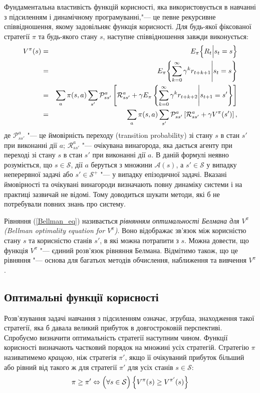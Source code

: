 Фундаментальна властивість функцій корисності, яка використовується в навчанні з підсиленням і динамічному програмуванні,"--- це певне рекурсивне співвідношення, якому задовільняє функція корисності. Для будь-якої фіксованої стратегії $\pi$ та будь-якого стану $s$, наступне співвідношення завжди виконується:
\begin{eqnarray}
V^\pi(s) & = & E_\pi \Bigl\{R_t \Big| s_t = s \Bigr\} \nonumber\\
			& = & E_\pi \Biggl\{\sum_{k=0}^{\infty}\gamma^k r_{t+k+1} \Bigg| s_t = s \Biggr\} \nonumber\\
			& = & \sum_a \pi(s,a)\sum_{s'}\mathcal{P}^a_{ss'} \left[ \mathcal{R}^a_{ss'}+\gamma E_\pi \left\{\sum_{k=0}^{\infty}\gamma^k r_{t+k+2} \Bigg| s_{t+1} = s' \right\} \right] \nonumber\\
			& = & \sum_a \pi(s,a)\sum_{s'}\mathcal{P}^a_{ss'} \left[ \mathcal{R}^a_{ss'}+\gamma V^\pi(s') \right],
\label{Bellman_eq}
\end{eqnarray}
де $\mathcal{P}^a_{ss'}$ "--- це ймовірність переходу (transition probability) зі стану $s$ в стан $s'$ при виконанні дії $a$; $\mathcal{R}^a_{ss'}$ "--- очікувана винагорода, яка дається агенту при переході зі стану $s$ в стан $s'$ при виконанні дії $a$. В даній формулі неявно розуміється, що $s \in \mathcal{S}$, дії $a$ беруться з множини $\mathcal{A}(s)$, а $s' \in \mathcal{S}$ у випадку неперервної задачі або $s' \in \mathcal{S^+}$ "--- у випадку епізодичної задачі. Вказані ймовірності та очікувані винагороди визначають повну динаміку системи і на практиці зазвичай не відомі. Тому доводиться шукати методи, які б не потребували повних знань про систему.

Рівняння (\ref{Bellman_eq}) називається \emph{рівнянням оптимальності Белмана для $V^\pi$ (Bellman optimality equation for $V^\pi$)}. Воно відображає зв'язок між корисністю стану $s$ та корисністю станів $s'$, в які можна потрапити з $s$. Можна довести, що функція $V^\pi$ "--- єдиний розв'язок рівняння Белмана. Відмітимо також, що це рівняння "--- основа для багатьох методів обчислення, наближення та вивчення $V^\pi$.

\subsection{Оптимальні функції корисності}

Розв'язування задачі навчання з підсиленням означає, згрубша, знаходження такої стратегії, яка б давала великий прибуток в довгостроковій перспективі. Спробуємо визначити оптимальність стратегії наступним чином. Функції корисності визначають частковий порядок на множині усіх стратегій. Стратегію $\pi$ називатимемо \emph{кращою}, ніж стратегія $\pi '$, якщо її очікуваний прибуток більший або рівний від такого ж для стратегії $\pi '$ для усіх станів $s \in \mathcal{S}$:
\begin{equation}
\pi \geq \pi ' \Leftrightarrow \Bigl(\forall s \in \mathcal{S}\Bigr)\left\{ V^\pi(s) \geq V^{\pi '}(s) \right\}
\end{equation}

